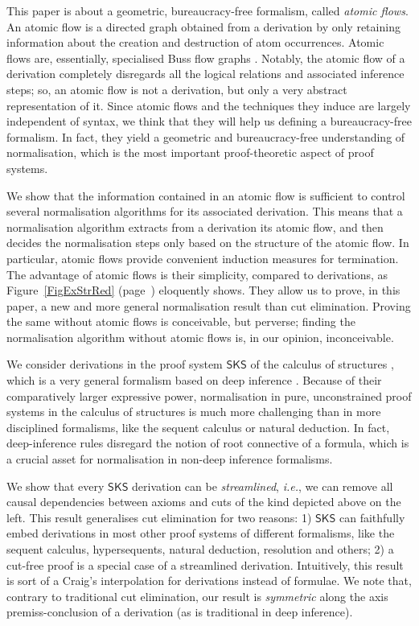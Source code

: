 \documentclass[a4paper]{LMCS}
\begin{document}
This paper is about a geometric, bureaucracy-free formalism, called \emph{atomic flows}. An atomic flow is a directed graph obtained from a derivation by only retaining information about the creation and destruction of atom occurrences. Atomic flows are, essentially, specialised Buss flow graphs \cite{Buss:91:The-Unde:uq}. Notably, the atomic flow of a derivation completely disregards all the logical relations and associated inference steps; so, an atomic flow is not a derivation, but only a very abstract representation of it. Since atomic flows and the techniques they induce are largely independent of syntax, we think that they will help us defining a bureaucracy-free formalism. In fact, they yield a geometric and bureaucracy-free understanding of normalisation, which is the most important proof-theoretic aspect of proof systems.

We show that the information contained in an atomic flow is sufficient to control several normalisation algorithms for its associated derivation. This means that a normalisation algorithm extracts from a derivation its atomic flow, and then decides the normalisation steps only based on the structure of the atomic flow. In particular, atomic flows provide convenient induction measures for termination. The advantage of atomic flows is their simplicity, compared to derivations, as Figure~\ref{FigExStrRed} (page~\pageref{FigExStrRed}) eloquently shows. They allow us to prove, in this paper, a new and more general normalisation result than cut elimination. Proving the same without atomic flows is conceivable, but perverse; finding the normalisation algorithm without atomic flows is, in our opinion, inconceivable. 

We consider derivations in the proof system ${\mathsf{SKS}}$ of the calculus of structures \cite{BrunTiu:01:A-Local-:mz}, which is a very general formalism based on deep inference \cite{Gugl:06:A-System:kl}. Because of their comparatively larger expressive power, normalisation in pure, unconstrained proof systems in the calculus of structures is much more challenging than in more disciplined formalisms, like the sequent calculus or natural deduction. In fact, deep-inference rules disregard the notion of root connective of a formula, which is a crucial asset for normalisation in non-deep inference formalisms.

We show that every ${\mathsf{SKS}}$ derivation can be \emph{streamlined}, \emph{i.e.}, we can remove all causal dependencies between axioms and cuts of the kind depicted above on the left. This result generalises cut elimination for two reasons: 1) ${\mathsf{SKS}}$ can faithfully embed derivations in most other proof systems of different formalisms, like the sequent calculus, hypersequents, natural deduction, resolution and others; 2) a cut-free proof is a special case of a streamlined derivation. Intuitively, this result is sort of a Craig's interpolation for derivations instead of formulae. We note that, contrary to traditional cut elimination, our result is \emph{symmetric} along the axis premiss-conclusion of a derivation (as is traditional in deep inference).
\end{document}
